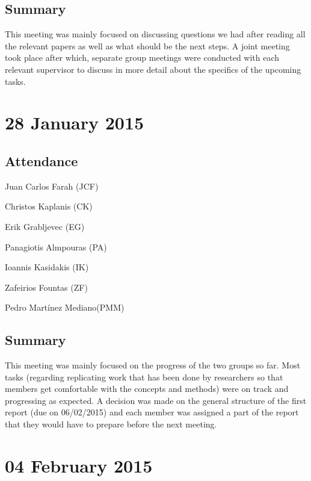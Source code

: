 \documentclass[a4paper,11pt]{article}
\begin{document}
\subsection*{Summary}
This meeting was mainly focused on discussing questions we had after reading all the relevant papers as well as what should be the next steps. A joint meeting took place after which, separate group meetings were conducted with each relevant supervisor to discuss in more detail about the specifics of the upcoming tasks.

\maketitle
\section*{28 January 2015}
\subsection*{Attendance}
\begin{compactenum}
\item Juan Carlos Farah (JCF)
\item Christos Kaplanis (CK)
\item Erik Grabljevec (EG)
\item Panagiotis Almpouras (PA)
\item Ioannis Kasidakis (IK)
\item Zafeirios Fountas (ZF)
\item Pedro Martínez Mediano(PMM)
\end{compactenum}

\subsection*{Summary}
This meeting was mainly focused on the progress of the two groups so far. Most tasks (regarding replicating work that has been done by researchers so that members get comfortable with the concepts and methods) were on track and progressing as expected. A decision was made on the general structure of the first report (due on 06/02/2015) and each member was assigned a part of the report that they would have to prepare before the next meeting.

\maketitle
\section*{04 February 2015}
\end{document}
